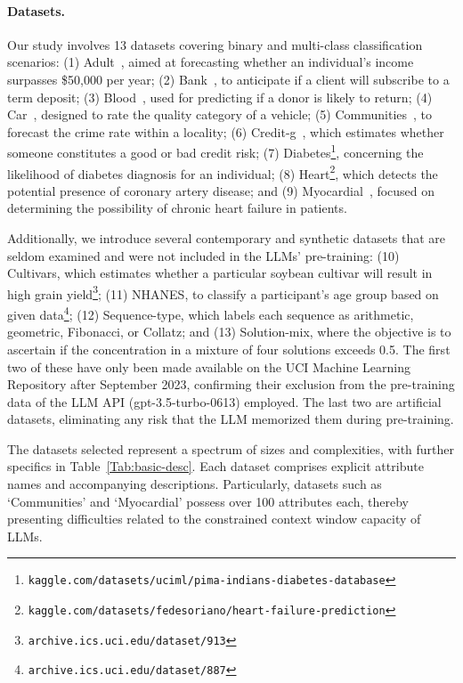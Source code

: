 \paragraph{Datasets.}
Our study involves 13 datasets covering binary and multi-class classification scenarios: (1) Adult~\cite{asuncion2007uci}, aimed at forecasting whether an individual’s income surpasses \$50,000 per year; (2) Bank~\cite{moro2014data}, to anticipate if a client will subscribe to a term deposit; (3) Blood~\cite{yeh2009knowledge}, used for predicting if a donor is likely to return; (4) Car~\cite{kadra2021well}, designed to rate the quality category of a vehicle; (5) Communities~\cite{misc_communities_and_crime_183}, to forecast the crime rate within a locality; (6) Credit-g~\cite{kadra2021well}, which estimates whether someone constitutes a good or bad credit risk; (7) Diabetes\footnote{\texttt{kaggle.com/datasets/uciml/pima-indians-diabetes-database}}, concerning the likelihood of diabetes diagnosis for an individual; (8) Heart\footnote{\texttt{kaggle.com/datasets/fedesoriano/heart-failure-prediction}}, which detects the potential presence of coronary artery disease; and (9) Myocardial~\cite{misc_myocardial_infarction_complications_579}, focused on determining the possibility of chronic heart failure in patients.

Additionally, we introduce several contemporary and synthetic datasets that are seldom examined and were not included in the LLMs’ pre-training: (10) Cultivars, which estimates whether a particular soybean cultivar will result in high grain yield\footnote{\texttt{archive.ics.uci.edu/dataset/913}}; (11) NHANES, to classify a participant’s age group based on given data\footnote{\texttt{archive.ics.uci.edu/dataset/887}}; (12) Sequence-type, which labels each sequence as arithmetic, geometric, Fibonacci, or Collatz; and (13) Solution-mix, where the objective is to ascertain if the concentration in a mixture of four solutions exceeds 0.5. The first two of these have only been made available on the UCI Machine Learning Repository after September 2023, confirming their exclusion from the pre-training data of the LLM API (gpt-3.5-turbo-0613) employed. The last two are artificial datasets, eliminating any risk that the LLM memorized them during pre-training.

The datasets selected represent a spectrum of sizes and complexities, with further specifics in Table~\ref{Tab:basic-desc}. Each dataset comprises explicit attribute names and accompanying descriptions. Particularly, datasets such as `Communities' and `Myocardial' possess over 100 attributes each, thereby presenting difficulties related to the constrained context window capacity of LLMs.

